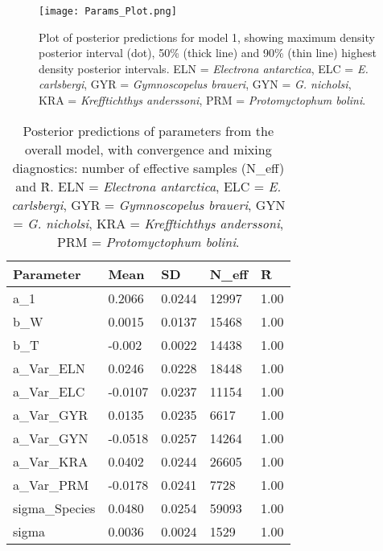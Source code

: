 \documentclass[12pt, titlepage]{article}
\begin{document}
\begin{figure}[H]
\texttt{[image: Params\_Plot.png]}
\caption{Plot of posterior predictions for model 1, showing maximum density posterior interval (dot), 50\% (thick line) and 90\% (thin line) highest density posterior intervals. ELN = \textit{Electrona antarctica}, ELC = \textit{E. carlsbergi}, GYR = \textit{Gymnoscopelus braueri}, GYN = \textit{G. nicholsi}, KRA = \textit{Krefftichthys anderssoni}, PRM = \textit{Protomyctophum bolini}.}
\end{figure}

\begin{table}
\begin{center}
\caption{Posterior predictions of parameters from the overall model, with convergence and mixing diagnostics: number of effective samples (N\_eff) and \^R. ELN = \textit{Electrona antarctica}, ELC = \textit{E. carlsbergi}, GYR = \textit{Gymnoscopelus braueri}, GYN = \textit{G. nicholsi}, KRA = \textit{Krefftichthys anderssoni}, PRM = \textit{Protomyctophum bolini}.}

\def\arraystretch{1.5}
  \begin{tabular}{ | l | l | l | l | l |}
    \hline
    \textbf{Parameter} & Mean & SD & N\_eff & \^R \\ \hline
    a\_1 & 0.2066 & 0.0244 & 12997 & 1.00 \\ \hline
    b\_W & 0.0015 & 0.0137 & 15468 & 1.00\\ \hline
    b\_T & -0.002 & 0.0022 & 14438 & 1.00 \\ \hline
    a\_Var\_ELN & 0.0246 & 0.0228 & 18448 & 1.00 \\ \hline
    a\_Var\_ELC & -0.0107 & 0.0237 & 11154 & 1.00 \\ \hline
    a\_Var\_GYR & 0.0135 & 0.0235 & 6617 & 1.00 \\ \hline
    a\_Var\_GYN & -0.0518 & 0.0257 & 14264 & 1.00 \\ \hline
    a\_Var\_KRA & 0.0402 & 0.0244 & 26605 & 1.00 \\ \hline
    a\_Var\_PRM & -0.0178 & 0.0241 & 7728 & 1.00 \\ \hline
    sigma\_Species & 0.0480 & 0.0254 & 59093 & 1.00 \\ \hline
    sigma & 0.0036 & 0.0024 & 1529 & 1.00 \\
    \hline
  \end{tabular}
  \end{center}
\end{table}
\end{document}
